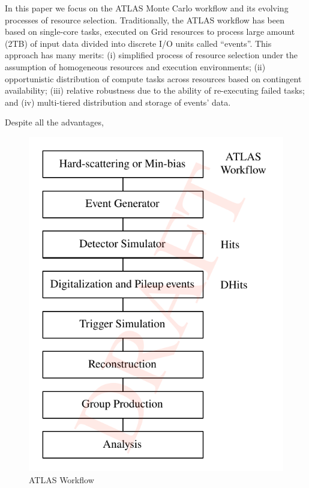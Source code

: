 In this paper we focus on the ATLAS Monte Carlo workflow and its evolving processes of resource selection.
Traditionally, the ATLAS workflow has been based on single-core tasks, executed
on Grid resources to process large amount (2TB) of input data divided into
discrete I/O units called ``events''. This approach has many merits: (i)
simplified process of resource selection under the assumption of homogeneous
resources and execution environments; (ii) opportunistic distribution of compute
tasks across resources based on contingent availability; (iii) relative
robustness due to the ability of re-executing failed tasks; and (iv)
multi-tiered distribution and storage of events' data.

Despite all the advantages,

\begin{figure}
  \includegraphics[width=\columnwidth]{figures/atlas_workflow.pdf}
  \caption{ATLAS Workflow}
\label{fig:atlas_workflow}
\end{figure}
